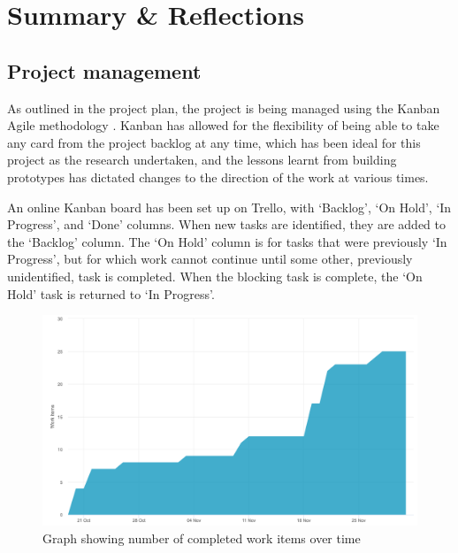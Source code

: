 \chapter{Summary \& Reflections}




\section{Project management}

As outlined in the project plan, the project is being managed using the Kanban Agile methodology \cite{stellman2014learning}. Kanban has allowed for the flexibility of being able to take any card from the project backlog at any time, which has been ideal for this project as the research undertaken, and the lessons learnt from building prototypes has dictated changes to the direction of the work at various times. 

An online Kanban board has been set up on Trello, with `Backlog', `On Hold', `In Progress', and `Done' columns. When new tasks are identified, they are added to the `Backlog' column. The `On Hold' column is for tasks that were previously `In Progress', but for which work cannot continue until some other, previously unidentified, task is completed. When the blocking task is complete, the `On Hold' task is returned to `In Progress'.

\begin{figure}[h!]
  \centering
  \includegraphics[width=\textwidth]{images/burnup.png}
  \caption{Graph showing number of completed work items over time}
  \label{fig:burnup}
\end{figure}

